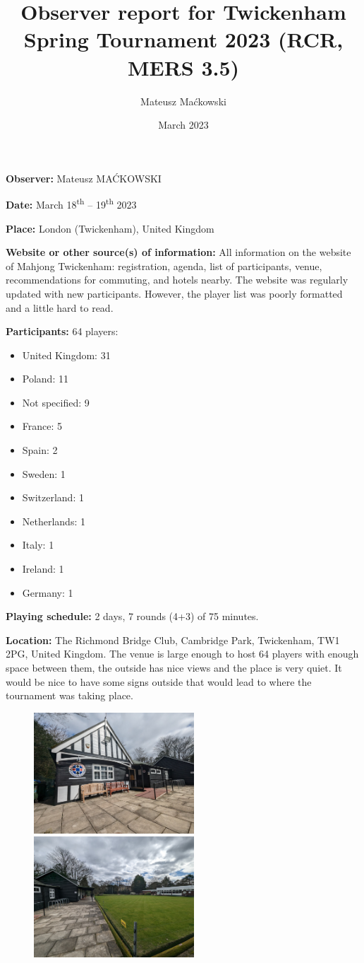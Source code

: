 \documentclass{article}
\title{Observer report for Twickenham Spring Tournament 2023 (RCR, MERS 3.5)}
\author{Mateusz Maćkowski}
\date{March 2023}
\newcommand{\repsec}[1]{\textbf{#1:}}
\begin{document}
\maketitle

\repsec{Observer}
Mateusz MAĆKOWSKI

\repsec{Date}
March 18\textsuperscript{th} -- 19\textsuperscript{th} 2023

\repsec{Place}
London (Twickenham), United Kingdom

\repsec{Website or other source(s) of information}
All information on the website of Mahjong Twickenham: registration, agenda, list of participants, venue, recommendations for commuting, and hotels nearby.
The website was regularly updated with new participants.
However, the player list was poorly formatted and a little hard to read.

\repsec{Participants} 64 players:
\begin{itemize}
    \item United Kingdom: 31
    \item Poland: 11
    \item Not specified: 9
    \item France: 5
    \item Spain: 2
    \item Sweden: 1
    \item Switzerland: 1
    \item Netherlands: 1
    \item Italy: 1
    \item Ireland: 1
    \item Germany: 1
\end{itemize}

\repsec{Playing schedule}
2 days, 7 rounds (4+3) of 75 minutes.

\repsec{Location}
The Richmond Bridge Club, Cambridge Park, Twickenham, TW1 2PG, United Kingdom.
The venue is large enough to host 64 players with enough space between them, the outside has nice views and the place is very quiet.
It would be nice to have some signs outside that would lead to where the tournament was taking place.

\begin{figure}[ht]
\centering
\includegraphics[width=6cm]{tournament1}
\includegraphics[width=6cm]{tournament2}
\end{figure}
\end{document}
